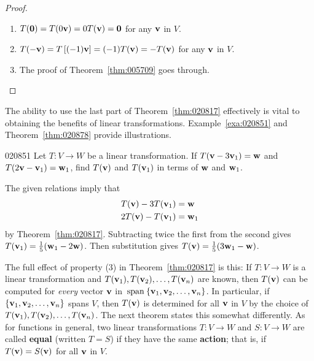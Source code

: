 \begin{proof}
\begin{enumerate}
\item $T(\textbf{0}) = T(0\textbf{v}) = 0T(\textbf{v}) = \textbf{0}$ for any $\textbf{v}$ in $V$.

\item $T(-\textbf{v}) = T \left[ (-1)\textbf{v} \right] = (-1)T(\textbf{v}) = -T(\textbf{v})$ for any $\textbf{v}$ in $V$.

\item The proof of Theorem~\ref{thm:005709} goes through.

\end{enumerate}
\vspace*{-2em}\end{proof}

The ability to use the last part of Theorem~\ref{thm:020817} effectively is vital to obtaining the benefits of linear transformations. Example~\ref{exa:020851} and Theorem~\ref{thm:020878} provide illustrations.

\begin{example}{}{020851}
Let $T : V \to W$ be a linear transformation. If $T(\textbf{v} - 3\textbf{v}_{1}) = \textbf{w}$ and $T(2\textbf{v} - \textbf{v}_{1}) = \textbf{w}_{1}$, find $T(\textbf{v})$ and $T(\textbf{v}_{1})$ in terms of $\textbf{w}$ and $\textbf{w}_{1}$.


\begin{solution}
The given relations imply that
\begin{align*}
T(\textbf{v}) - 3T(\textbf{v}_1) &= \textbf{w} \\
2T(\textbf{v}) - T(\textbf{v}_1) &= \textbf{w}_1
\end{align*} 
by Theorem~\ref{thm:020817}. Subtracting twice the first from the second gives $T(\textbf{v}_1) = \tfrac{1}{5}(\textbf{w}_1 - 2\textbf{w})$. Then substitution gives $T(\textbf{v}) = \tfrac{1}{5}(3\textbf{w}_1 - \textbf{w})$.
\end{solution}
\end{example}

The full effect of property (3) in Theorem~\ref{thm:020817} is this: If $T : V \to W$ is a linear transformation and $T(\textbf{v}_{1}), T(\textbf{v}_{2}), \dots, T(\textbf{v}_{n})$ are known, then $T(\textbf{v})$ can be computed for \textit{every} vector $\textbf{v}$ in $\thinspace\operatorname{span\medspace}\{\textbf{v}_{1}, \textbf{v}_{2}, \dots, \textbf{v}_{n}\}$. In particular, if $\{\textbf{v}_{1}, \textbf{v}_{2}, \dots, \textbf{v}_{n}\}$ spans $V$, then $T(\textbf{v})$ is determined for all $\textbf{v}$ in $V$ by the choice of $T(\textbf{v}_{1}), T(\textbf{v}_{2}), \dots, T(\textbf{v}_{n})$. The next theorem states this somewhat differently. As for functions in general, two linear transformations $T : V \to W$ and $S : V \to W$ are called \textbf{equal} (written $T = S$) if they have the same \textbf{action}; that is, if $T(\textbf{v}) = S(\textbf{v})$ for all $\textbf{v}$ in $V$.


